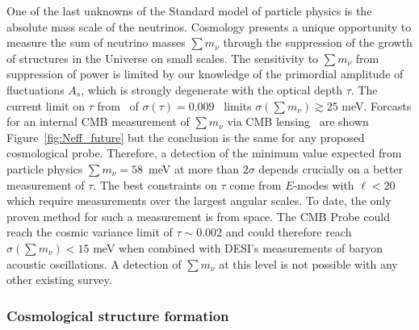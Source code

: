 \vspace{-0.05in}

One of the last unknowns of the Standard model of particle physics is the absolute mass scale of the neutrinos.  
Cosmology presents a unique opportunity to measure the sum of neutrino masses $\sum m_\nu$ through the 
suppression of the growth of structures in the Universe on small scales.  
The sensitivity to $\sum m_\nu$ from suppression of power is limited by our knowledge of 
the primordial amplitude of fluctuations $A_s$, which is strongly degenerate with the optical depth $\tau$.  
The current limit on $\tau$ from \planck\ of $\sigma({\tau}) = 0.009$~\cite{} limits 
$\sigma(\sum m_\nu) \gtrsim 25$ meV. Forcasts for an internal 
CMB measurement of $\sum m_\nu$ via CMB lensing~\cite{Kaplinghat:2003bh} are shown Figure~\ref{fig:Neff_future} but the conclusion is the same for any proposed cosmological probe.  
Therefore, a detection of the minimum value expected from particle physics  
$\sum m_\nu = 58$~meV at more than $2 \sigma$ depends crucially on a better measurement of $\tau$.  
The best constraints on $\tau$ come from $E$-modes with $\ell < 20$ which require 
measurements over the largest angular scales.
To date, the only proven method for such a measurement is from space.  
The \ac{CMB} Probe could reach the cosmic variance limit of $\tau \sim 0.002$ and could therefore 
reach $\sigma(\sum m_\nu) < 15$ meV when combined with DESI's measurements of 
baryon acoustic oscillations.  
A detection of $\sum m_\nu$ at this level is not possible with any other existing survey.

\vspace{-0.15in}

\subsubsection{Cosmological structure formation}

